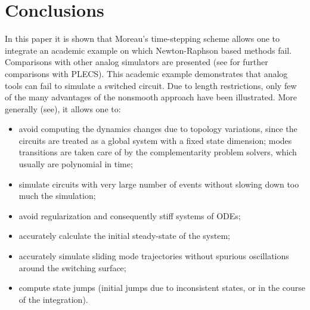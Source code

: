 \section{Conclusions}
\label{section5}
{\color{black}
In this paper it is  shown that Moreau's time-stepping scheme allows one to integrate an academic example on which Newton-Raphson based methods fail.  Comparisons with other analog simulators are presented (see \cite{Acary.ea_RR2009} for further comparisons with PLECS).  This academic example demonstrates that analog tools can fail to simulate a switched circuit.
 Due to length restrictions, only few of the many advantages of the nonsmooth approach have been illustrated. More generally (see\cite{Acary.ea_RR2009}), it allows one to:
\begin{itemize}
\item avoid computing the dynamics changes due to topology variations, since the circuits are treated as a global system with a fixed state dimension; modes transitions are taken care of by the complementarity problem solvers, which usually are polynomial in time;
\item simulate circuits with very large number of events without slowing down too much the simulation;
\item avoid regularization and consequently stiff systems of ODEs;
\item accurately calculate the initial steady-state of the system;
\item accurately simulate sliding mode trajectories without spurious oscillations around the switching surface;
\item compute state jumps (initial jumps due to inconsistent states, or in the course of the integration). 
\end{itemize}
 
}



